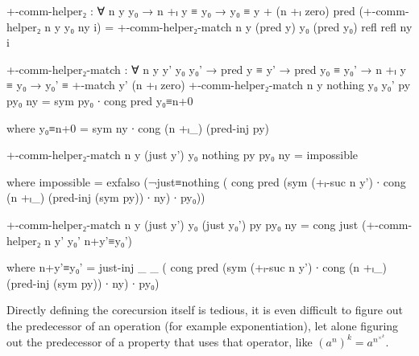 \begin{AgdaSuppressSpace}
\begin{code}
  +-comm-helper₂ :
    ∀ n y y₀ → n +ₗ y ≡ y₀ → y₀ ≡ y + (n +ₗ zero)
  pred (+-comm-helper₂ n y y₀ ny i) =
    +-comm-helper₂-match
      n y (pred y) y₀ (pred y₀) refl refl ny i

  +-comm-helper₂-match :
    ∀ n y y' y₀ y₀' →
    pred y ≡ y' → pred y₀ ≡ y₀' → n +ₗ y ≡ y₀ →
    y₀' ≡ +-match y' (n +ₗ zero)
  +-comm-helper₂-match n y nothing y₀ y₀' py py₀ ny =
    sym py₀ ∙ cong pred y₀≡n+0
\end{code}
\begin{code}[hide]
    where
    y₀≡n+0 = sym ny ∙ cong (n +ₗ_) (pred-inj py)
\end{code}
\begin{code}
  +-comm-helper₂-match n y (just y') y₀ nothing py py₀ ny
    = impossible
\end{code}
\begin{code}[hide]
    where
    impossible =
      exfalso
        (¬just≡nothing
          ( cong pred
              (sym (+ₗ-suc n y') ∙ cong (n +ₗ_) (pred-inj (sym py)) ∙ ny) ∙
            py₀))
\end{code}
\begin{code}
  +-comm-helper₂-match n y (just y') y₀ (just y₀') py py₀ ny
    = cong just (+-comm-helper₂ n y' y₀' n+y'≡y₀')
\end{code}
\begin{code}[hide]
    where
    n+y'≡y₀' =
      just-inj _ _
        ( cong pred
            (sym (+ₗ-suc n y') ∙ cong (n +ₗ_) (pred-inj (sym py)) ∙ ny) ∙
          py₀)
\end{code}
\end{AgdaSuppressSpace}

Directly defining the corecursion itself is tedious, it is even
difficult to figure out the predecessor of an operation (for example
exponentiation), let alone figuring out the predecessor of a property
that uses that operator, like $(a ^n) ^k = a ^n ^\times ^k$.
